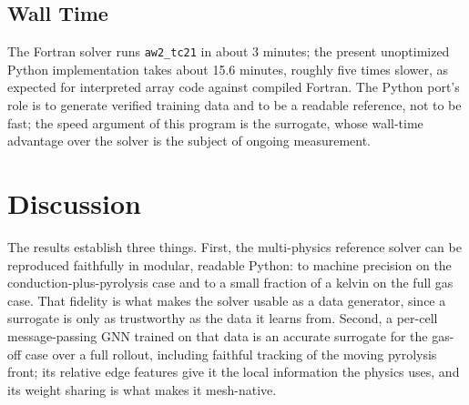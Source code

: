 \documentclass[conference]{IEEEtran}
\begin{document}
\subsection{Wall Time}
The Fortran solver runs \texttt{aw2\_tc21} in about 3 minutes; the present
unoptimized Python implementation takes about 15.6 minutes, roughly five times
slower, as expected for interpreted array code against compiled Fortran. The
Python port's role is to generate verified training data and to be a readable
reference, not to be fast; the speed argument of this program is the surrogate,
whose wall-time advantage over the solver is the subject of ongoing measurement.

\section{Discussion}
The results establish three things. First, the multi-physics reference solver can
be reproduced faithfully in modular, readable Python: to machine precision on the
conduction-plus-pyrolysis case and to a small fraction of a kelvin on the full gas
case. That fidelity is what makes the solver usable as a data generator, since a
surrogate is only as trustworthy as the data it learns from. Second, a per-cell
message-passing GNN trained on that data is an accurate surrogate for the gas-off
case over a full rollout, including faithful tracking of the moving pyrolysis
front; its relative edge features give it the local information the physics uses,
and its weight sharing is what makes it mesh-native.
\end{document}
